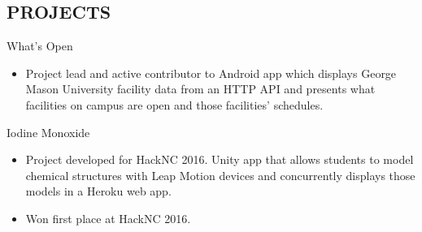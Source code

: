 \documentclass{res} %
\begin{document}
\begin{resume}

\section{PROJECTS} 

What's Open
\begin{itemize}
\item Project lead and active contributor to Android app which displays George Mason University facility data from an HTTP API and presents what facilities on campus are open and those facilities' schedules.
\end{itemize}

Iodine Monoxide
\begin{itemize}
\item Project developed for HackNC 2016. Unity app that allows students to model chemical structures with Leap Motion devices and concurrently displays those models in a Heroku web app.
\item Won first place at HackNC 2016.
\end{itemize}


\end{resume}
\end{document}
